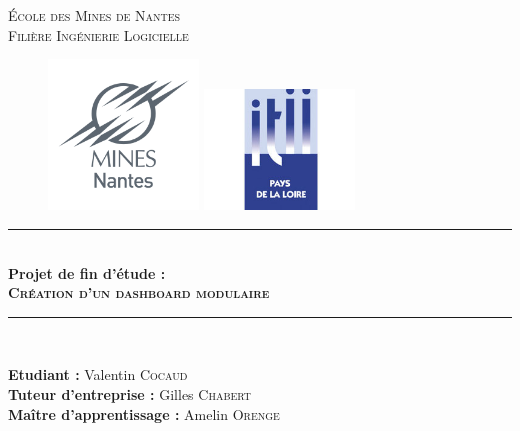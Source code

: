 \documentclass[twoside, 12pt]{report}
\newcommand{\HRule}{\rule{\linewidth}{0.5mm}}
\begin{document}
\begin{titlepage}
  \begin{sffamily}
		\begin{center}
			\textsc{\LARGE École des Mines de Nantes\\Filière Ingénierie Logicielle}\\[2cm]
			\begin{figure}[h]
				\begin{minipage}{0.5\textwidth}
					\centering
					\includegraphics[width=4cm]{img/minesNantes.png}   
				\end{minipage}%
				\begin{minipage}{0.5\textwidth}
					\centering
					\includegraphics[width=4cm]{img/itii.jpg}  
				\end{minipage}
			\end{figure}

			\vfill
			\HRule \\[0.4cm]
				{\huge \bfseries Projet de fin d'étude :\\\textsc{Création d'un dashboard modulaire}\\[0.4cm] }
			\HRule \\[2cm]

			\vfill
			\begin{minipage}{0.8\textwidth}
				\begin{center} \large
					{\textbf{Etudiant :}} Valentin \textsc{Cocaud}\\
					{\textbf{Tuteur d'entreprise :}} Gilles \textsc{Chabert}\\
					{\textbf{Maître d'apprentissage :}} Amelin \textsc{Orenge}\\
				\end{center}
			\end{minipage}


\end{center}
\end{sffamily}
\end{titlepage}
\end{document}
